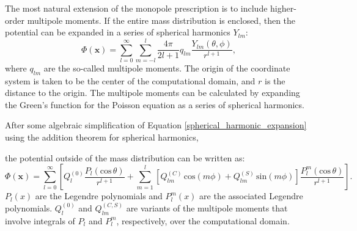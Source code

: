 \documentclass[12pt,preprint]{aastex}
\begin{document}
The most natural extension of the monopole prescription is to include higher-order multipole moments. If the entire mass distribution is enclosed, then the potential can be expanded in a series of spherical harmonics $Y_{lm}$:
\begin{equation}
  \Phi(\mathbf{x}) = \sum_{l=0}^{\infty}\sum_{m=-l}^{l} \frac{4\pi}{2l + 1} q_{lm} \frac{Y_{lm}(\theta,\phi)}{r^{l+1}}, \label{spherical_harmonic_expansion}
\end{equation}
where $q_{lm}$ are the so-called multipole moments. The origin of the coordinate system is taken to be the center of the computational domain, and $r$ is the distance to the origin. The multipole moments can be calculated by expanding the Green's function for the Poisson equation as a series of spherical harmonics.

After some algebraic simplification of Equation \ref{spherical_harmonic_expansion} using the addition theorem for spherical harmonics,

the potential outside of the mass distribution can be written as:
\begin{equation}
  \Phi(\mathbf{x}) = \sum_{l=0}^{\infty} \left[Q_l^{(0)} \frac{P_l(\text{cos}\, \theta)}{r^{l+1}} + \sum_{m = 1}^{l}\left[ Q_{lm}^{(C)}\, \text{cos}(m\phi) + Q_{lm}^{(S)}\, \text{sin}(m\phi)\right] \frac{P_{l}^{m}(\text{cos}\, \theta)}{r^{l+1}} \right].\label{multipole_potential}
\end{equation}
$P_l(x)$ are the Legendre polynomials and $P_{l}^{m}(x)$ are the associated Legendre polynomials. $Q_l^{(0)}$ and $Q_{lm}^{(C,S)}$ are variants of the multipole moments that involve integrals of $P_l$ and $P_l^m$, respectively, over the computational domain.
\end{document}
